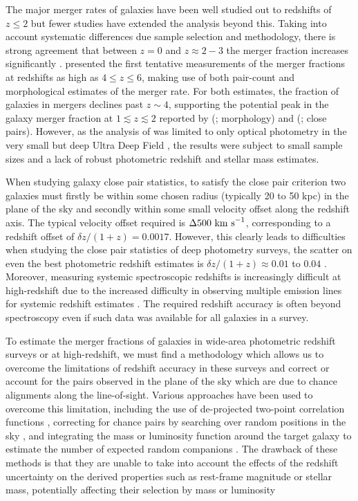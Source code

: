 The major merger rates of galaxies have been well studied out to redshifts of $z \leq 2$ but fewer studies have extended the analysis beyond this. Taking into account systematic differences due sample selection and methodology, there is strong agreement that between $z = 0$ and $z\approx 2 - 3$ the merger fraction increases significantly \citep{LopezSanjuan:2010cz,Bluck:2012dh,Ownsworth:2014gt}. \citet{2009MNRAS.397..208C} presented the first tentative measurements of the merger fractions at redshifts as high as $4 \leq z \leq 6$, making use of both pair-count and morphological estimates of the merger rate. For both estimates, the fraction of galaxies in mergers declines past $z\sim4$, supporting the potential peak in the galaxy merger fraction at $1 \lesssim z \lesssim 2$ reported by \citeauthor{Conselice:2008de} (\citeyear{Conselice:2008de}; morphology) and \citeauthor{RyanJr:2008ka} (\citeyear{RyanJr:2008ka}; close pairs). However, as the analysis of \citet{2009MNRAS.397..208C} was limited to only optical photometry in the very small but deep Ultra Deep Field \citep{2006AJ....132.1729B}, the results were subject to small sample sizes and a lack of robust photometric redshift and stellar mass estimates.

When studying galaxy close pair statistics, to satisfy the close pair criterion two galaxies must firstly be within some chosen radius (typically 20 to 50 kpc) in the plane of the sky and secondly within some small velocity offset along the redshift axis. The typical velocity offset required is $\Delta 500~\rm{km~s}^{-1}$, corresponding to a redshift offset of  $\delta z / (1+z) = 0.0017$. However, this clearly leads to difficulties when studying the close pair statistics of deep photometry surveys, the scatter on even the best photometric redshift estimates is $\delta z / (1+z) \approx 0.01$ to $0.04$ \citep{Molino:2014iz}. Moreover, measuring systemic spectroscopic redshifts is increasingly difficult at high-redshift due to the increased difficulty in observing multiple emission lines for systemic redshift estimates \citep{Stark:2014vc}. The required redshift accuracy is often beyond spectroscopy even if such data was available for all galaxies in a survey.

To estimate the merger fractions of galaxies in wide-area photometric redshift surveys or at high-redshift, we must find a methodology which allows us to overcome the limitations of redshift accuracy in these surveys and correct or account for the pairs observed in the plane of the sky which are due to chance alignments along the line-of-sight. Various approaches have been used to overcome this limitation, including the use of de-projected two-point correlation functions \citep{Bell:2006ey}, correcting for chance pairs by searching over random positions in the sky \citep{Kartaltepe:2007dv}, and integrating the mass or luminosity function around the target galaxy to estimate the number of expected random companions \citep{LeFevre:2000iq,Bluck:2009in,Bundy:2009jw}. The drawback of these methods is that they are unable to take into account the effects of the redshift uncertainty on the derived properties such as rest-frame magnitude or stellar mass, potentially affecting their selection by mass or luminosity

